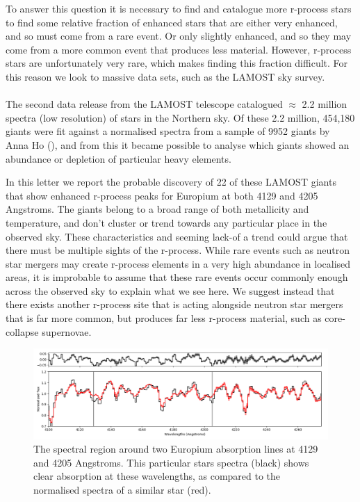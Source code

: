 \documentclass[a4paper,fleqn,usenatbib]{mnras}
\begin{document}
To answer this question it is necessary to find and catalogue more r-process stars to find some relative fraction of enhanced stars that are either very enhanced, and so must come from a rare event. Or only slightly enhanced, and so they may come from a more common event that produces less material. However, r-process stars are unfortunately very rare, which makes finding this fraction difficult. For this reason we look to massive data sets, such as the LAMOST sky survey.
\\\\
The second data release from the LAMOST telescope catalogued $\approx$ 2.2 million spectra (low resolution) of stars in the Northern sky. Of these 2.2 million, 454,180 giants were fit against a normalised spectra from a sample of 9952 giants by Anna Ho (\cite{AnnaHo2017}), and from this it became possible to analyse which giants showed an abundance or depletion of particular heavy elements. 

In this letter we report the probable discovery of 22 of these LAMOST giants that show enhanced r-process peaks for Europium at both 4129 and 4205 Angstroms. The giants belong to a broad range of both metallicity and temperature, and don't cluster or trend towards any particular place in the observed sky. These characteristics and seeming lack-of a trend could argue that there must be multiple sights of the r-process. While rare events such as neutron star mergers may create r-process elements in a very high abundance in localised areas, it is improbable to assume that these rare events occur commonly enough across the observed sky to explain what we see here. We suggest instead that there exists another r-process site that is acting alongside neutron star mergers that is far more common, but produces far less r-process material, such as core-collapse supernovae.


\begin{figure}
	\includegraphics[width=\columnwidth]{423451}
	\caption{The spectral region around two Europium absorption lines at 4129 and 4205 Angstroms. This particular stars spectra (black) shows clear absorption at these wavelengths, as compared to the normalised spectra of a similar star (red).}
	\label{fig:starindex_423451}
\end{figure}
\end{document}

